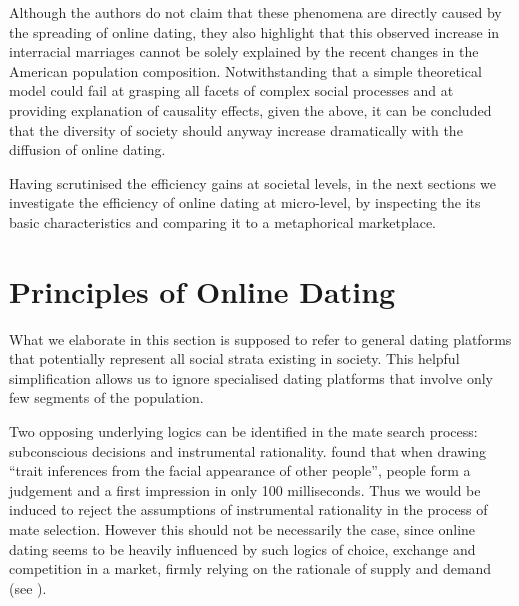 Although the authors do not claim that these phenomena are directly
caused by the spreading of online dating, they also highlight that
this observed increase in interracial marriages cannot be solely explained
by the recent changes in the American population composition. Notwithstanding
that a simple theoretical model could fail at grasping all facets
of complex social processes and at providing explanation of causality
effects, given the above, it can be concluded that the diversity of
society should anyway increase dramatically with the diffusion of
online dating.

Having scrutinised the efficiency gains at societal levels, in the
next sections we investigate the efficiency of online dating at micro-level,
by inspecting the its basic characteristics and comparing it to a
metaphorical marketplace.

\section{Principles of Online Dating}

What we elaborate in this section is supposed to refer to general
dating platforms that potentially represent all social strata existing
in society. This helpful simplification allows us to ignore specialised
dating platforms that involve only few segments of the population.

Two opposing underlying logics can be identified in the mate search
process: subconscious decisions and instrumental rationality. \citet{Willis2006First-Impressio}
found that when drawing \textquotedblleft trait inferences from the
facial appearance of other people\textquotedblright , people form
a judgement and a first impression in only 100 milliseconds. Thus
we would be induced to reject the assumptions of instrumental rationality
in the process of mate selection. However this should not be necessarily
the case, since online dating seems to be heavily influenced by such
logics of choice, exchange and competition in a market, firmly relying
on the rationale of supply and demand (see ).

